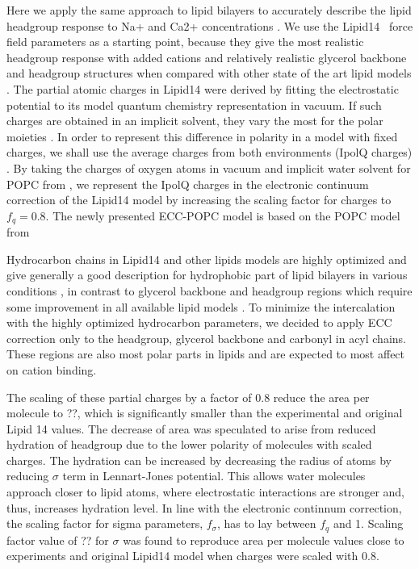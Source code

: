 \documentclass[aip,jcp,twocolumn]{revtex4}
\begin{document}
Here we apply the same approach to lipid bilayers to accurately 
describe the lipid headgroup response to Na+ and Ca2+ concentrations \cite{catte16}. 
We use the Lipid14~\cite{dickson14} force field parameters as a starting point,
because they give the most realistic headgroup response with added cations 
and relatively realistic glycerol backbone and headgroup structures
when compared with other state of the art lipid models \cite{botan15,catte16}.
The partial atomic charges in Lipid14 were derived by fitting the electrostatic 
potential to its model quantum chemistry representation in vacuum.
If such charges are obtained in an implicit solvent, they vary the most for the polar moieties \cite{maiejewski14}. 
In order to represent this difference in polarity in a model with fixed charges, 
we shall use the average charges from both environments (IpolQ charges) \cite{Cerutti2013}. 
By taking the charges of oxygen atoms in vacuum and implicit water solvent for POPC from \cite{maciejewski14}, 
we represent the IpolQ charges in the electronic continuum correction of the Lipid14 model
by increasing the scaling factor for charges to $f_q = 0.8$. 
The newly presented ECC-POPC model is based on the POPC model from 

Hydrocarbon chains in Lipid14 and other lipids models are highly optimized and
give generally a good description for hydrophobic part of lipid bilayers
in various conditions \cite{ollila16},
in contrast to glycerol backbone and headgroup regions which require
some improvement in all available lipid models \cite{botan15}. 
To minimize the intercalation with the highly optimized hydrocarbon
parameters, we decided to apply ECC correction only
to the headgroup, glycerol backbone and carbonyl in acyl chains.
These regions are also most polar parts in lipids and are expected
to most affect on cation binding.   

The scaling of these partial charges by a factor of 0.8 reduce the 
area per molecule to ??, which is significantly smaller than the
experimental and original Lipid 14 values.  
The decrease of area was speculated 
to arise from reduced hydration
of headgroup due to the lower polarity of molecules with scaled charges.
The hydration can be increased by decreasing the radius of atoms
by reducing $\sigma$ term in Lennart-Jones potential.
This allows water molecules approach closer to lipid atoms,
where electrostatic interactions are stronger and, thus, 
increases hydration level.
In line with the electronic continnum correction,
the scaling factor for sigma parameters, $f_\sigma$,
has to lay between $f_q$ and 1. Scaling factor
value of ?? for $\sigma$ was found to reproduce
area per molecule values close to experiments and
original Lipid14 model when charges were scaled with
0.8.
\end{document}

